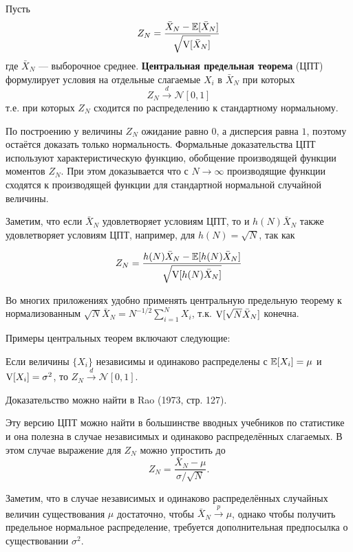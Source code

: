 \begin{theorem}
Пусть 
\begin{equation}
Z_N=\frac{\bar{X}_N-\mathbb{E}[\bar{X}_N]}{\sqrt{\mathrm{V}[\bar{X}_N]}}
\end{equation}
где $\bar{X}_N$ --- выборочное среднее. \textbf{Центральная предельная теорема} (ЦПТ) формулирует условия на отдельные слагаемые $X_i$ в $\bar{X}_N$ при которых
\begin{equation}
Z_N \overset{d}{\to} \mathcal{N} [0,1]
\end{equation}
т.е. при которых $Z_N$ сходится по распределению к стандартному нормальному.
\end{theorem}

По построению у величины $Z_N$ ожидание равно $0$, а дисперсия равна $1$, поэтому остаётся доказать только нормальность. Формальные доказательства ЦПТ используют характеристическую функцию, обобщение производящей функции моментов $Z_N$. При этом доказывается что с $N\to \infty$ производящие функции сходятся к производящей функции для стандартной нормальной случайной величины.

Заметим, что если $\bar{X}_N$ удовлетворяет условиям ЦПТ, то и $h(N)\bar{X}_N$ также удовлетворяет условиям ЦПТ, например, для $h(N)=\sqrt{N}$, так как

\[
Z_N=\frac{h(N)\bar{X}_N-\mathbb{E}[h(N)\bar{X}_N]}{\sqrt{\mathrm{V}[h(N)\bar{X}_N]}}
\]

Во многих приложениях удобно применять центральную предельную теорему к нормализованным $\sqrt{N}\bar{X}_N=N^{-1/2}\sum_{i=1}^{N} X_i$, т.к. $\mathrm{V}[\sqrt{N}\bar{X}_N]$ конечна.

Примеры центральных теорем включают следующие:

\begin{theorem}
\label{th:A14}
Если величины $\{X_i\}$ независимы и одинаково распределены с $\mathbb{E}[X_i]=\mu$ и $\mathrm{V}[X_i]=\sigma^2$, то $Z_N \overset{d}{\to} \mathcal{N}[0,1]$.
\end{theorem}

Доказательство можно найти в Rao (1973, стр. 127).

Эту версию ЦПТ можно найти в большинстве вводных учебников по статистике и она полезна в случае независимых и одинаково распределённых слагаемых. В этом случае выражение для $Z_N$ можно упростить до
\[
Z_N=\frac{\bar{X}_N-\mu}{\sigma/\sqrt{N}}.
\]

Заметим, что в случае независимых и одинаково распределённых случайных величин существования $\mu$ достаточно, чтобы $\bar{X}_N \overset{p}{\to} \mu$, однако чтобы получить предельное нормальное распределение, требуется дополнительная предпосылка о существовании $\sigma^2$.

